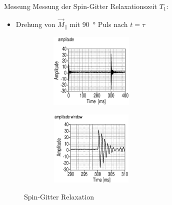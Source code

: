 \begin{frame}{Messung}
Messung der Spin-Gitter Relaxationszeit $T_1$:
\begin{itemize}
\item Drehung von $\vec{M}_\parallel$ mit \SI{90}{\degree} Puls nach $t=\tau$
\end{itemize}
	\begin{figure}
	\centering
	\begin{subfigure}{.49\textwidth}
	\centering
	\includegraphics[width=5cm, height=3.6cm]{images//sequenz21.eps}
	\end{subfigure}
	\begin{subfigure}{.49\textwidth}
	\centering
	\includegraphics[width=5cm, height=3.6cm]{images//sequenz21einzel.eps}
	\end{subfigure}
	\caption{Spin-Gitter Relaxation}
	\end{figure}
\end{frame}

